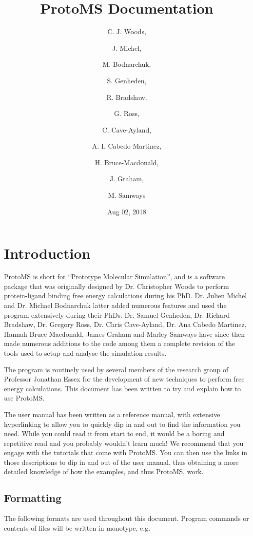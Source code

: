 \documentclass[letterpaper,10pt,english]{sphinxmanual}
\title{ProtoMS Documentation}
\date{Aug 02, 2018}
\author{C. J. Woods, \and J. Michel, \and M. Bodnarchuk, \and S. Genheden, \and R. Bradshaw, \and G. Ross, \and C. Cave-Ayland, \and A. I. Cabedo Martinez, \and H. Bruce-Macdonald, \and J. Graham, \and M. Samways}
\begin{document}
\maketitle
\sphinxtableofcontents
{}\label{\detokenize{index::doc}}



\chapter{Introduction}
\label{\detokenize{introduction:introduction}}\label{\detokenize{introduction:protoms-documentation}}\label{\detokenize{introduction::doc}}
ProtoMS is short for “Prototype Molecular Simulation”, and is a software package that was originally designed by Dr. Christopher Woods to perform protein-ligand binding free energy calculations during his PhD. Dr. Julien Michel and Dr. Michael Bodnarchuk latter added numerous features and used the program extensively during their PhDs. Dr. Samuel Genheden, Dr. Richard Bradshaw, Dr. Gregory Ross, Dr. Chris Cave-Ayland, Dr. Ana Cabedo Martinez, Hannah Bruce-Macdonald, James Graham and Marley Samways have since then made numerous additions to the code among them a complete revision of the tools used to setup and analyse the simulation results.

The program is routinely used by several members of the research group of Professor Jonathan Essex for the development of new techniques to perform free energy calculations. This document has been written to try and explain how to use ProtoMS.

The user manual has been written as a reference manual, with extensive hyperlinking to allow you to quickly dip in and out to find the information you need. While you could read it from start to end, it would be a boring and repetitive read and you probably wouldn’t learn much! We recommend that you engage with the tutorials that come with ProtoMS. You can then use the links in those descriptions to dip in and out of the user manual, thus obtaining a more detailed knowledge of how the examples, and thus ProtoMS, work.


\section{Formatting}
\label{\detokenize{introduction:formatting}}
The following formats are used throughout this document. Program commands or contents of files will be written in monotype, e.g.

%
\begin{sphinxVerbatim}[commandchars=\\\{\}]
 
\end{sphinxVerbatim}
\end{document}
